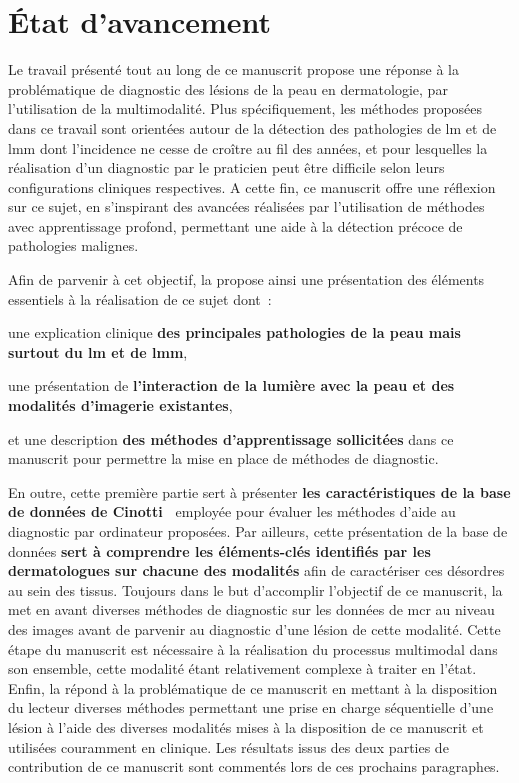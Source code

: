 \renewcommand{\thechapter}{\roman{chapter}}
\setcounter{chapter}{4}
\setcounter{figure}{0}

\label{chap:conclusion}

\section*{État d'avancement}
Le travail présenté tout au long de ce manuscrit propose une réponse à la problématique de diagnostic des lésions de la peau en dermatologie, par l'utilisation de la multimodalité. Plus spécifiquement, les méthodes proposées dans ce travail sont orientées autour de la détection des pathologies de \gls{lm} et de \gls{lmm} dont l'incidence ne cesse de croître au fil des années, et pour lesquelles la réalisation d'un diagnostic par le praticien peut être difficile selon leurs configurations cliniques respectives. A cette fin, ce manuscrit offre une réflexion sur ce sujet, en s'inspirant des avancées réalisées par l'utilisation de méthodes avec apprentissage profond, permettant une aide à la détection précoce de pathologies malignes.\par

Afin de parvenir à cet objectif, la  propose ainsi une présentation des éléments essentiels à la réalisation de ce sujet dont~:
\begin{inlinerate}
    \item une explication clinique \textbf{des principales pathologies de la peau mais surtout du \gls{lm} et de \gls{lmm}},
    \item une présentation de \textbf{l'interaction de la lumière avec la peau et des modalités d'imagerie existantes},
    \item et une description \textbf{des méthodes d'apprentissage sollicitées} dans ce manuscrit pour permettre la mise en place de méthodes de diagnostic.
\end{inlinerate} 
En outre, cette première partie sert à présenter \textbf{les caractéristiques de la base de données de Cinotti~} employée pour évaluer les méthodes d'aide au diagnostic par ordinateur proposées. Par ailleurs, cette présentation de la base de données \textbf{sert à comprendre les éléments-clés identifiés par les dermatologues sur chacune des modalités} afin de caractériser ces désordres au sein des tissus. Toujours dans le but d'accomplir l'objectif de ce manuscrit, la  met en avant diverses méthodes de diagnostic sur les données de \gls{mcr} au niveau des images avant de parvenir au diagnostic d'une lésion de cette modalité. Cette étape du manuscrit est nécessaire à la réalisation du processus multimodal dans son ensemble, cette modalité étant relativement complexe à traiter en l'état. Enfin, la  répond à la problématique de ce manuscrit en mettant à la disposition du lecteur diverses méthodes permettant une prise en charge séquentielle d'une lésion à l'aide des diverses modalités mises à la disposition de ce manuscrit et utilisées couramment en clinique. Les résultats issus des deux parties de contribution de ce manuscrit sont commentés lors de ces prochains paragraphes.\par

